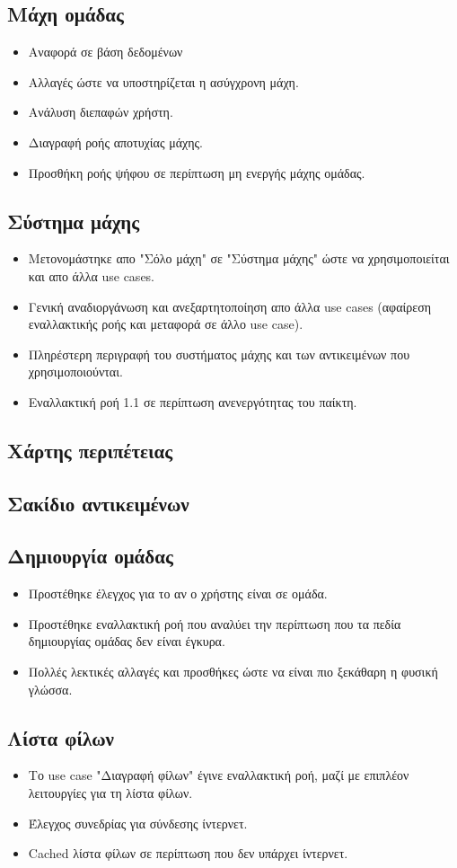 \subsection{Μάχη ομάδας}
\begin{itemize}
    \item Αναφορά σε βάση δεδομένων
    \item Αλλαγές ώστε να υποστηρίζεται η ασύγχρονη μάχη.
    \item Ανάλυση διεπαφών χρήστη.
    \item Διαγραφή ροής αποτυχίας μάχης.
    \item Προσθήκη ροής ψήφου σε περίπτωση μη ενεργής μάχης ομάδας.
\end{itemize}
\subsection{Σύστημα μάχης}
\begin{itemize}
    \item Μετονομάστηκε απο "Σόλο μάχη" σε "Σύστημα μάχης" ώστε να χρησιμοποιείται και απο άλλα use cases.
    \item Γενική αναδιοργάνωση και ανεξαρτητοποίηση απο άλλα use cases (αφαίρεση εναλλακτικής ροής και μεταφορά σε άλλο use case).
    \item Πληρέστερη περιγραφή του συστήματος μάχης και των αντικειμένων που χρησιμοποιούνται.
    \item Εναλλακτική ροή 1.1 σε περίπτωση ανενεργότητας του παίκτη.
\end{itemize}
\subsection{Χάρτης περιπέτειας}
\subsection{Σακίδιο αντικειμένων}
\subsection{Δημιουργία ομάδας}
\begin{itemize}
    \item Προστέθηκε έλεγχος για το αν ο χρήστης είναι σε ομάδα.
    \item Προστέθηκε εναλλακτική ροή που αναλύει την περίπτωση που τα πεδία δημιουργίας ομάδας δεν είναι έγκυρα.
    \item Πολλές λεκτικές αλλαγές και προσθήκες ώστε να είναι πιο ξεκάθαρη η φυσική γλώσσα.
\end{itemize}
\subsection{Λίστα φίλων}
\begin{itemize}
    \item Το use case "Διαγραφή φίλων" έγινε εναλλακτική ροή, μαζί με επιπλέον λειτουργίες για τη λίστα φίλων.
    \item Έλεγχος συνεδρίας για σύνδεσης ίντερνετ.
    \item Cached λίστα φίλων σε περίπτωση που δεν υπάρχει ίντερνετ.
\end{itemize}


\clearpage